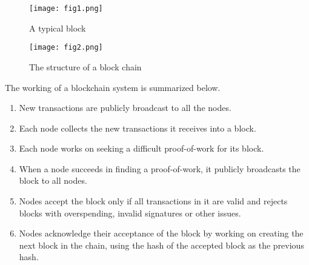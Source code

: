 \begin{figure}[!htb]
   \begin{minipage}{0.25\textwidth}   
     \centering
     \texttt{[image: fig1.png]}
     \caption{A typical block}
     \label{Fig:1}
   \end{minipage}\hfill
   \begin{minipage}{0.65\textwidth}
     \centering
     \texttt{[image: fig2.png]}
     \caption{The structure of a block chain\cite{bcpic}}
     \label{Fig:2}
   \end{minipage}\hfill
\end{figure}

The working of a blockchain system is summarized below.
\begin{enumerate}
\item New transactions are publicly broadcast to all the nodes.
\item Each node collects the new transactions it receives into a block.
\item Each node works on seeking a difficult proof-of-work for its block.
\item When a node succeeds in finding a proof-of-work, it publicly broadcasts the block to all nodes.
\item Nodes accept the block only if all transactions in it are valid and rejects blocks with overspending, invalid signatures or other issues.
\item Nodes acknowledge their acceptance of the block by working on creating the next block in the
chain, using the hash of the accepted block as the previous hash.
\end{enumerate}

